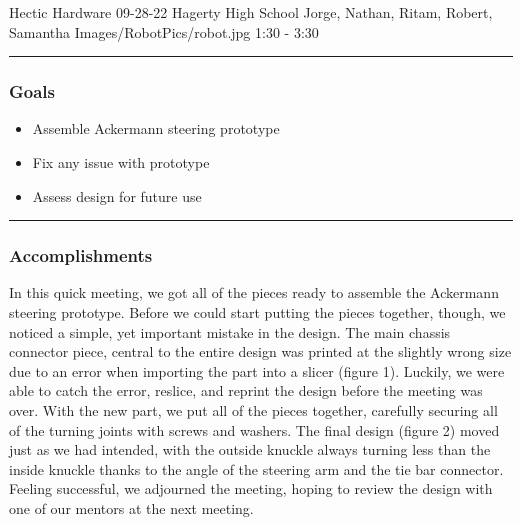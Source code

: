 \insertmeeting 
	{Hectic Hardware} 
	{09-28-22} 
	{Hagerty High School}
	{Jorge, Nathan, Ritam, Robert, Samantha}
	{Images/RobotPics/robot.jpg}
	{1:30 - 3:30}
	
\noindent\hfil\rule{\textwidth}{.4pt}\hfil
\subsubsection*{Goals}
\begin{itemize}
    \item Assemble Ackermann steering prototype
    \item Fix any issue with prototype
    \item Assess design for future use



\end{itemize} 

\noindent\hfil\rule{\textwidth}{.4pt}\hfil

\subsubsection*{Accomplishments}
In this quick meeting, we got all of the pieces ready to assemble the Ackermann steering prototype. Before we could start putting the pieces together, though, we noticed a simple, yet important mistake in the design. The main chassis connector piece, central to the entire design was printed at the slightly wrong size due to an error when importing the part into a slicer (figure 1). Luckily, we were able to catch the error, reslice, and reprint the design before the meeting was over. With the new part, we put all of the pieces together, carefully securing all of the turning joints with screws and washers. The final design (figure 2) moved just as we had intended, with the outside knuckle always turning less than the inside knuckle thanks to the angle of the steering arm and the tie bar connector. Feeling successful, we adjourned the meeting, hoping to review the design with one of our mentors at the next meeting.


 

